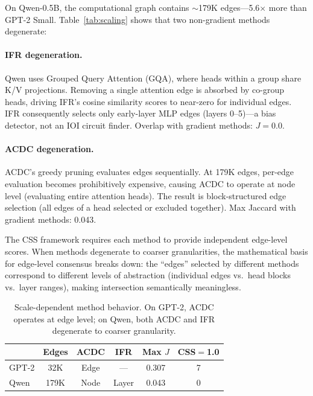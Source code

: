 \documentclass[11pt,a4paper]{article}
\newcommand{\acdc}{\textsc{ACDC}}
\newcommand{\ifr}{\textsc{IFR}}
\begin{document}
On Qwen-0.5B, the computational graph contains $\sim$179K edges---5.6$\times$ more than GPT-2 Small. Table~\ref{tab:scaling} shows that two non-gradient methods degenerate:

\paragraph{IFR degeneration.} Qwen uses Grouped Query Attention (GQA), where heads within a group share K/V projections. Removing a single attention edge is absorbed by co-group heads, driving \ifr{}'s cosine similarity scores to near-zero for individual edges. \ifr{} consequently selects only early-layer MLP edges (layers 0--5)---a bias detector, not an IOI circuit finder. Overlap with gradient methods: $J = 0.0$.

\paragraph{ACDC degeneration.} \acdc{}'s greedy pruning evaluates edges sequentially. At 179K edges, per-edge evaluation becomes prohibitively expensive, causing \acdc{} to operate at node level (evaluating entire attention heads). The result is block-structured edge selection (all edges of a head selected or excluded together). Max Jaccard with gradient methods: 0.043.

The CSS framework requires each method to provide independent edge-level scores. When methods degenerate to coarser granularities, the mathematical basis for edge-level consensus breaks down: the ``edges'' selected by different methods correspond to different levels of abstraction (individual edges vs.\ head blocks vs.\ layer ranges), making intersection semantically meaningless.

\begin{table}[t]
\centering
\small
\begin{tabular}{lccccc}
\toprule
& \textbf{Edges} & \textbf{ACDC} & \textbf{IFR} & \textbf{Max $J$} & \textbf{CSS$=$1.0}\\
\midrule
GPT-2 & 32K & Edge & --- & 0.307 & 7 \\
Qwen  & 179K & Node & Layer & 0.043 & 0 \\
\bottomrule
\end{tabular}
\caption{Scale-dependent method behavior. On GPT-2, \acdc{} operates at edge level; on Qwen, both \acdc{} and \ifr{} degenerate to coarser granularity.}
\label{tab:gpt2-vs-qwen}
\end{table}
\end{document}

